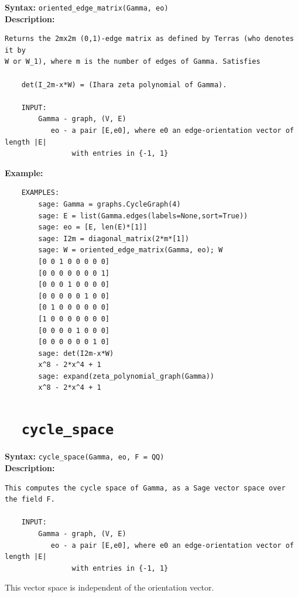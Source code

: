 \documentclass{article}
\begin{document}
\textbf{Syntax:} \verb}oriented_edge_matrix(Gamma, eo)}\\

\textbf{Description:}
\begin{verbatim}
Returns the 2mx2m (0,1)-edge matrix as defined by Terras (who denotes it by 
W or W_1), where m is the number of edges of Gamma. Satisfies 

    det(I_2m-x*W) = (Ihara zeta polynomial of Gamma).

    INPUT:
        Gamma - graph, (V, E)
           eo - a pair [E,e0], where e0 an edge-orientation vector of length |E|
                with entries in {-1, 1}

\end{verbatim}

\textbf{Example:}
\begin{verbatim}
    EXAMPLES:
        sage: Gamma = graphs.CycleGraph(4)
        sage: E = list(Gamma.edges(labels=None,sort=True))
        sage: eo = [E, len(E)*[1]]
        sage: I2m = diagonal_matrix(2*m*[1])
        sage: W = oriented_edge_matrix(Gamma, eo); W
        [0 0 1 0 0 0 0 0]
        [0 0 0 0 0 0 0 1]
        [0 0 0 1 0 0 0 0]
        [0 0 0 0 0 1 0 0]
        [0 1 0 0 0 0 0 0]
        [1 0 0 0 0 0 0 0]
        [0 0 0 0 1 0 0 0]
        [0 0 0 0 0 0 1 0]
        sage: det(I2m-x*W)
        x^8 - 2*x^4 + 1
        sage: expand(zeta_polynomial_graph(Gamma))
        x^8 - 2*x^4 + 1
\end{verbatim}

\section{\tt \ \ cycle\_space}

\textbf{Syntax:} \verb}cycle_space(Gamma, eo, F = QQ)}\\

\textbf{Description:}
\begin{verbatim}
This computes the cycle space of Gamma, as a Sage vector space over the field F.

    INPUT:
        Gamma - graph, (V, E)
           eo - a pair [E,e0], where e0 an edge-orientation vector of length |E|
                with entries in {-1, 1}
\end{verbatim}

This vector space is independent of the orientation vector.
\end{document}
